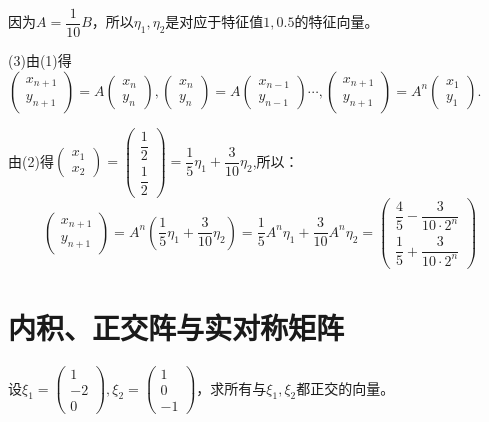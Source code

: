 \documentclass[a4paper]{report}
\begin{document}
\begin{jie}
因为$A=\dfrac{1}{10}B$，所以$\eta_1,\eta_2$是对应于特征值$1,0.5$的特征向量。

(3)由(1)得$
\begin{pmatrix}
x_{n+1}\\ y_{n+1}
\end{pmatrix}=A
\begin{pmatrix}
x_n\\ y_n
\end{pmatrix}
,\begin{pmatrix}
x_n\\ y_n
\end{pmatrix}
=A\begin{pmatrix}
x_{n-1}\\ y_{n-1}
\end{pmatrix}\cdots,\begin{pmatrix}
x_{n+1}\\ y_{n+1}
\end{pmatrix}=A^n
\begin{pmatrix}
x_1\\ y_1
\end{pmatrix}$.

由(2)得$
\begin{pmatrix}
 x_1\\ x_2
\end{pmatrix}=\begin{pmatrix}
               \dfrac{1}{2}\\[4pt]\dfrac{1}{2}
              \end{pmatrix}=\dfrac{1}{5}\eta_1+\dfrac{3}{10}\eta_2
$,所以：
\begin{equation*}
\begin{pmatrix}
x_{n+1}\\ y_{n+1}
\end{pmatrix}=A^n\left(\dfrac{1}{5}\eta_1+\dfrac{3}{10}\eta_2\right)=\dfrac{1}{5}A^{n}\eta_1+\dfrac{3}{10}A^{n}\eta_2=
\begin{pmatrix}
\dfrac{4}{5}-\dfrac{3}{10\cdot 2^n}\\[4pt]\dfrac{1}{5}+\dfrac{3}{10\cdot 2^n}
\end{pmatrix}
\end{equation*}
\end{jie}

\clearpage
\section{内积、正交阵与实对称矩阵}
\EX 设$\xi_1=
\begin{pmatrix}
1\\ -2\\0
\end{pmatrix},\xi_2=
\begin{pmatrix}
1\\ 0\\-1
\end{pmatrix}
$，求所有与$\xi_1,\xi_2$都正交的向量。
\end{document}
